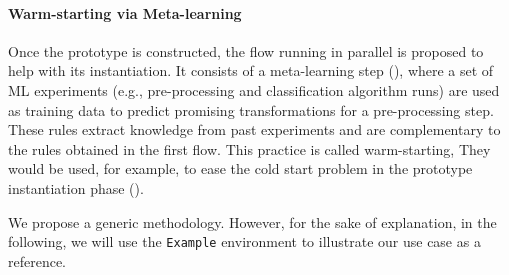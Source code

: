 

\paragraph{Warm-starting via Meta-learning} Once the prototype is constructed, the flow running in parallel is proposed to help with its instantiation.
It consists of a meta-learning step  (), where a set of ML experiments (e.g., pre-processing and classification algorithm runs) are used as training data to predict promising transformations for a pre-processing step.
These rules extract knowledge from past experiments and are complementary to the rules obtained in the first flow.
This practice is called warm-starting,
They would be used, for example, to ease the cold start problem in the prototype instantiation phase  ().

We propose a generic methodology.
However, for the sake of explanation, in the following, we will use the \texttt{Example} environment to illustrate our use case as a reference.



